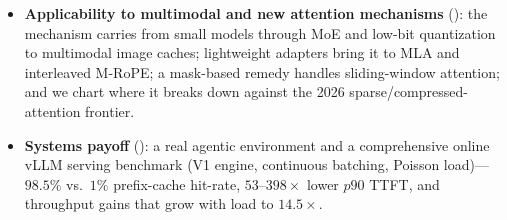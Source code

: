 \begin{itemize}[leftmargin=1.2em,itemsep=1pt,topsep=2pt]
$\equiv$ full recompute in QA accuracy)---with a pre-registered, statistically-controlled evaluation.
\item \textbf{Applicability to multimodal and new attention mechanisms} (): the mechanism carries from small models through MoE and
low-bit quantization to multimodal image caches; lightweight adapters bring it to MLA and interleaved
M-RoPE; a mask-based remedy handles sliding-window attention; and we chart where it breaks down against the
2026 sparse/compressed-attention frontier.
\item \textbf{Systems payoff} (): a real agentic environment and a comprehensive online
vLLM serving benchmark (V1 engine, continuous batching, Poisson load)---$98.5\%$ vs.\ $1\%$ prefix-cache
hit-rate, $53$--$398\times$ lower $p90$ TTFT, and throughput gains that grow with load to $14.5\times$.
\end{itemize}

